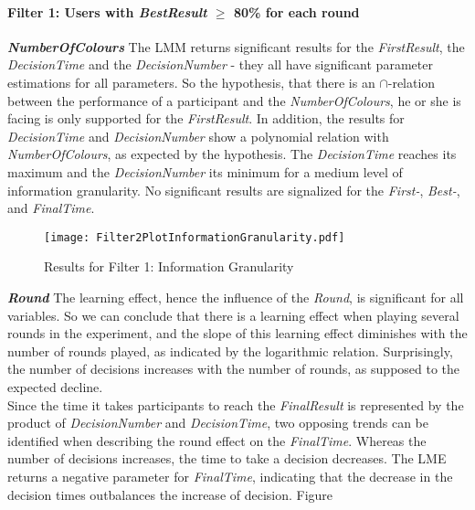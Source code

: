 \paragraph{Filter 1: Users with \textit{BestResult} $\geq$ 80\% for each round}
\textbf{\textit{NumberOfColours} } The \ac{LMM} returns significant results for the \textit{FirstResult}, the \textit{DecisionTime} and the \textit{DecisionNumber}  - they all have significant parameter estimations for all parameters. So the hypothesis, that there is an \textbf{$\cap$}-relation between the performance of a participant and the \textit{NumberOfColours}, he or she is facing is only supported for the \textit{FirstResult}. In addition, the results for \textit{DecisionTime} and \textit{DecisionNumber} show a polynomial relation with \textit{NumberOfColours}, as expected by the hypothesis. The \textit{DecisionTime} reaches its maximum and the \textit{DecisionNumber} its minimum for a medium level of information granularity. No significant results are signalized for the \textit{First-}, \textit{Best-}, and \textit{FinalTime}. 
\begin{figure}[H] %
\begin{center}
\texttt{[image: Filter2PlotInformationGranularity.pdf]}    
  \caption[Results for Filter 1: Information Granularity]{Results for Filter 1: Information Granularity\footnotemark}
    \label{fig:Results for Filter 1: Information Granularity} 
\end{center}
\end{figure}

\textbf{\textit{Round} }The learning effect, hence the influence of the \textit{Round}, is significant for all variables. So we can conclude that there is a learning effect when playing several rounds in the experiment, and the slope of this learning effect diminishes with the number of rounds played, as indicated by the logarithmic relation. Surprisingly, the number of decisions increases with the number of rounds, as supposed to the expected decline. \\
Since the time it takes participants to reach the \textit{FinalResult} is represented by the product of \textit{DecisionNumber} and \textit{DecisionTime}, two opposing trends can be identified when describing the round effect on the \textit{FinalTime}. Whereas the number of decisions increases, the time to take a decision decreases. The \ac{LME} returns a negative parameter for \textit{FinalTime},  indicating that the decrease in the decision times outbalances the increase of decision. Figure 


